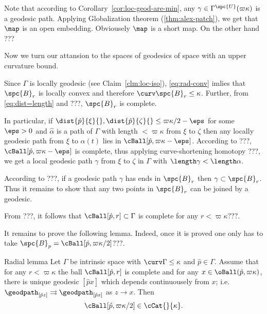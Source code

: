 Note that according to Corollary~\ref{cor:loc-geod-are-min}, 
any $\gamma\in\Gamma^\spc{U}(\varpi\kappa)$ is a geodesic path.
Applying Globalization theorem (\ref{thm:alex-patch}),
we get that $\map$ is an open embedding.
Obviousely $\map$ is a short map.
On the other hand ???%
\qeds


Now we turn our attansion to the spaces of geodesics of space with an upper curvature bound.









Since $\Gamma$ is locally geodesic (see Claim~\ref{clm:loc-iso}),
\ref{eq:rad-conv} imlies that $\spc{B}_r$ is locally convex and therefore $\curv\spc{B}_r\le\kappa$.
Further, from \ref{eq:dist=length} and ???, $\spc{B}_r$ is complete.



In particular,
if $\dist{\hat p}{\xi}{},\dist{\hat p}{\zeta}{}\le \varpi\kappa/2-\eps$  for some $\eps>0$
and $\hat\alpha$ is a path of $\Gamma$ with length $<\varpi\kappa$ from $\xi$ to $\zeta$ 
then any locally geodesic path from $\xi$ to $\alpha(t)$ lies in 
$\cBall[\hat p,\varpi\kappa-\eps]$.
According to ???, $\cBall[\hat p,\varpi\kappa-\eps]$ is complete, 
thus applying curve-shortening homotopy ???, 
we get a local geodesic path $\gamma$ from $\xi$ to $\zeta$ in $\Gamma$ with 
$\length \gamma<\length\alpha$.

According to ???, if a geodesic path $\gamma$ has ends in $\spc{B}_r$ then $\gamma\subset\spc{B}_r$.
Thus it remains to show that any two points in $\spc{B}_r$ can be joined by a geodesic.








From ???, it follows that $\cBall[\hat p,r]\subset\Gamma$ is complete for any $r<\varpi\kappa???$.

It remains to prove the following lemma.
Indeed, once it is proved one only has to take $\spc{B}_p=\cBall[\hat p,\varpi\kappa/2]$???.


\begin{thm}{Radial lemma}
Let $\Gamma$ be intrinsic space with $\curv\Gamma\le\kappa$
and $\hat p\in\Gamma$.
Assume that 
for any $r<\varpi\kappa$ the ball $\cBall[\hat p,r]$ is complete
and for any $x\in\oBall(\hat p,\varpi\kappa)$,
 there is unique geodesic $[\hat p x]$ which depends continuousely from $x$;
i.e. $\geodpath_{[\hat p z]}\rightrightarrows\geodpath_{[\hat p x]}$ as $z\to x$.
Then 
$$\cBall[\hat p,\varpi\kappa/2]\in\cCat{}{\kappa}.$$

\end{thm}

